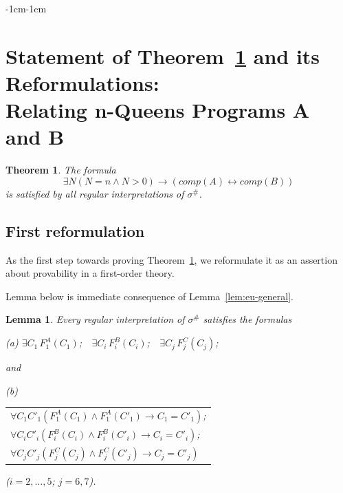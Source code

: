 \documentclass[11pt]{article}
\newtheorem{lemma}{Lemma}
\newtheorem{theorem}{Theorem}
\def\lrar{\leftrightarrow}
\def\beq{\begin{equation}}
\def\eeq#1{\label{#1}\end{equation}}
\begin{document}
\begin{adjustwidth}{-1cm}{-1cm}
\section{Statement of Theorem~\ref{thm:ab} and its Reformulations:\\ Relating n-Queens Programs A and B}


\begin{theorem}\label{thm:ab}
The formula
\beq
\exists N(N=n\land N>0) \to (\mathit{comp}(A)\lrar\mathit{comp}(B))
\eeq{thm1}
is satisfied by all regular interpretations of $\sigma^\#$.
\end{theorem}

\subsection{First reformulation}\label{sec:reform1}

As the first step towards proving Theorem~\ref{thm:ab}, we reformulate it
as an assertion about provability in a first-order theory.


Lemma below is immediate consequence of Lemma~\ref{lem:eu-general}.
\medskip
\begin{lemma}\label{lem:eu}
  Every regular interpretation of $\sigma^\#$ satisfies the formulas
 \medskip
 
 (a) $\exists C_1\,F^A_1(C_1)$;\ \  $\exists C_i\,F^B_i(C_i)$;\ \    $\exists C_j\,F^C_j(C_j)$;
 
 \medskip\noindent and

 \medskip
 (b)
 \begin{tabular}{l} 
  $\forall C_1C'_1(F^A_1(C_1)\land F^A_1(C'_1) \to C_1=C'_1)$;\\  
 $\forall C_iC'_i(F^B_i(C_i)\land F^B_i(C'_i) \to C_i=C'_i)$;\\  
   $\forall C_jC'_j(F^C_j(C_j)\land F^C_j(C'_j) \to C_j=C'_j)$
\end{tabular}

 \medskip\noindent
  ($i=2,\dots,5$; $j=6,7$).
\end{lemma}


\end{adjustwidth}
\end{document}

